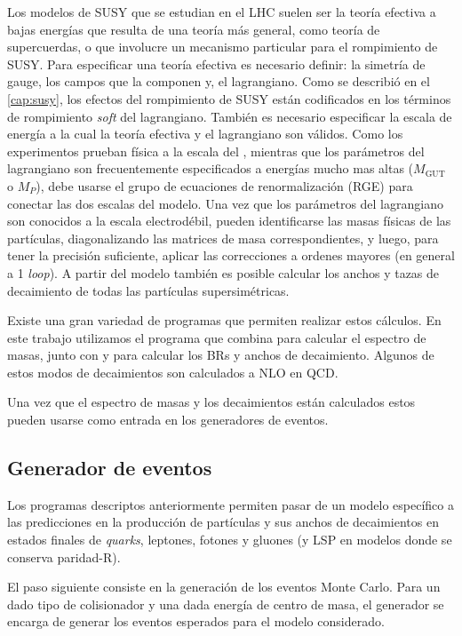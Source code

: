 Los modelos de SUSY que se estudian en el LHC suelen ser la teoría efectiva a
bajas energías que resulta de una teoría más general, como teoría de
supercuerdas, o que involucre un mecanismo particular para el rompimiento de
SUSY. Para especificar una teoría efectiva es necesario definir: la simetría de
gauge, los campos que la componen y, el lagrangiano. Como se describió en el
\cref{cap:susy}, los efectos del rompimiento de SUSY están codificados en los
términos de rompimiento \emph{soft} del lagrangiano. También es necesario especificar
la escala de energía a la cual la teoría efectiva y el lagrangiano son válidos.
Como los experimentos prueban física a la escala del {\tev}, mientras que los
parámetros del lagrangiano son frecuentemente especificados a energías mucho mas
altas ($M_\text{GUT}$ o $M_P$), debe usarse el grupo de ecuaciones de
renormalización (RGE) para conectar las dos escalas del modelo. Una vez que los
parámetros del lagrangiano son conocidos a la escala electrodébil, pueden
identificarse las masas físicas de las partículas, diagonalizando las matrices
de masa correspondientes, y luego, para tener la precisión suficiente, aplicar
las correcciones a ordenes mayores (en general a 1 \emph{loop}). A partir del modelo
también es posible calcular los anchos y tazas de decaimiento de todas las
partículas supersimétricas.

Existe una gran variedad de programas que permiten realizar estos cálculos. En
este trabajo utilizamos el programa {\susyhit}\cite{Djouadi:2006bz} que combina
{\suspect}\cite{Djouadi2007426} para calcular el espectro de masas, junto con
{\sdecay}\cite{Muhlleitner:2004mka} y {\hdecay}\cite{Djouadi:1997yw} para
calcular los BRs y anchos de decaimiento. Algunos de estos modos de decaimientos
son calculados a NLO en QCD.

Una vez que el espectro de masas y los decaimientos están calculados estos
pueden usarse como entrada en los generadores de eventos.


\subsection{Generador de eventos}

Los programas descriptos anteriormente permiten pasar de un modelo específico a las
predicciones en la producción de partículas y sus anchos de decaimientos en
estados finales de \emph{quarks}, leptones, fotones y gluones (y LSP en modelos donde
se conserva paridad-R).

El paso siguiente consiste en la generación de los eventos Monte Carlo.
Para un dado tipo de colisionador y una dada energía de centro de masa,
el generador se encarga de generar los eventos esperados para el modelo
considerado.

